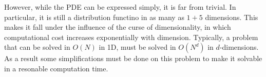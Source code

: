 However, while the PDE can be expressed simply, it is far from trivial. 
In particular, it is still a distribution functino in as many as $ 1 + 5$ dimensions.
This makes it fall under the influence of the curse of dimensionality, in which computational cost increases exponentially with dimension.
Typically, a problem that can be solved in $O(N)$ in 1D, must be solved in $O(N^d)$ in $d$-dimensions.
As a result some simplifications must be done on this problem to make it solvable in a resonable computation time.